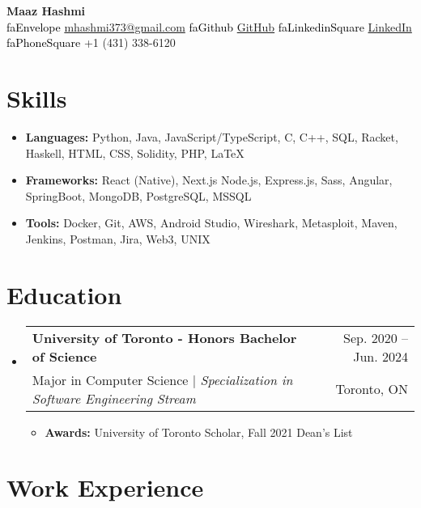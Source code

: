\documentclass[letterpaper,11pt]{article}
\makeatletter
\newcommand{\resumeItem}[1]{
  \item\small{
    {#1 \vspace{-2pt}}
  }
}
\newcommand{\skillsItem}[1]{
  \item\small{
    {#1 \vspace{-6pt}}
  }
}
\newcommand{\resumeSubheading}[5]{
  \vspace{-1pt}\item
  \begin{tabular*}{0.97\textwidth}{l@{\extracolsep{\fill}}r}
    \textbf{#1} & #2 \\
    \small{#3 | \textit{#4}} & \small {#5} \\
  \end{tabular*}\vspace{-5pt}
}
\newcommand{\resumeSubHeadingListStart}{\begin{itemize}[leftmargin=*,label={}]}
\newcommand{\resumeSubHeadingListEnd}{\end{itemize}}
\newcommand{\resumeItemListStart}{\begin{itemize}}
\newcommand{\resumeItemListEnd}{\end{itemize}\vspace{-5pt}}
\newcommand{\seticon}[1]{\textcolor{black}{\csname #1\endcsname}}
\makeatother
\begin{document}
\begin{center}
  \textbf{\huge{Maaz Hashmi}} \\
  \vspace*{0.4cm}
  \seticon{faEnvelope}
  \href{mailto:mhashmi373@gmail.com}{mhashmi373@gmail.com}\qquad
  \seticon{faGithub} \href{https://github.com/maazh10}{GitHub}\qquad
  \seticon{faLinkedinSquare}
  \href{https://www.linkedin.com/in/maaz-hashmi-526a82222/}{LinkedIn}\qquad
  \seticon{faPhoneSquare} +1 (431) 338-6120
\end{center}

\section{Skills}
\resumeSubHeadingListStart
\skillsItem
{\textbf{Languages:} Python, Java, JavaScript/TypeScript, C, C++, SQL, Racket, Haskell, HTML, CSS, Solidity, PHP, LaTeX}
\skillsItem
{\textbf{Frameworks:} React (Native), Next.js Node.js, Express.js, Sass, Angular, SpringBoot, MongoDB, PostgreSQL, MSSQL}
\skillsItem
{\textbf{Tools:} Docker, Git, AWS, Android Studio, Wireshark, Metasploit, Maven, Jenkins, Postman, Jira, Web3, UNIX}
\resumeSubHeadingListEnd

\section{Education}
\resumeSubHeadingListStart
\resumeSubheading
{University of Toronto - Honors Bachelor of Science}{Sep. 2020 -- Jun.
  2024}
{Major in Computer Science}{Specialization in Software Engineering
  Stream}{Toronto, ON}
\resumeItemListStart
\resumeItem
{\textbf{Awards:} University of Toronto Scholar, Fall 2021 Dean's
  List}
\resumeItemListEnd
\resumeSubHeadingListEnd

\section{Work Experience}
\end{document}
